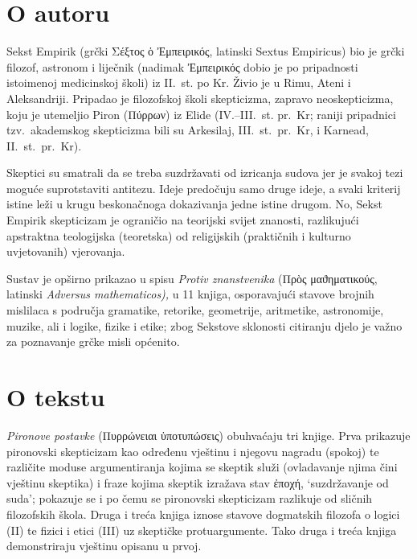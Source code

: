 
\section*{O autoru}

Sekst Empirik (grčki Σέξτος ὁ Ἐμπειρικός, latinski Sextus Empiricus) bio je grčki filozof, astronom i liječnik (nadimak Ἐμπειρικός dobio je po pripadnosti istoimenoj medicinskoj školi) iz II.~st. po Kr. Živio je u Rimu, Ateni i Aleksandriji. Pripadao je filozofskoj školi skepticizma, zapravo neoskepticizma, koju je utemeljio Piron \textgreek[variant=ancient]{(Πύρρων)} iz Elide (IV.–III.~st. pr.~Kr; raniji pripadnici tzv.\ akademskog skepticizma bili su Arkesilaj, III.~st.\ pr.~Kr, i Karnead, II.~st.\ pr.~Kr). 

Skeptici su smatrali da se treba suzdržavati od izricanja sudova jer je svakoj tezi moguće suprotstaviti antitezu. Ideje predočuju samo druge ideje, a svaki kriterij istine leži u krugu beskonačnoga dokazivanja jedne istine drugom. No, Sekst Empirik skepticizam je ograničio na teorijski svijet znanosti, razlikujući apstraktna teologijska (teoretska) od religijskih (praktičnih i kulturno uvjetovanih) vjerovanja. 

Sustav je opširno prikazao u spisu \textit{Protiv znanstvenika} \textgreek[variant=ancient]{(Πρὸς μαϑηματικούς,} latinski \textit{Adversus mathematicos),} u 11 knjiga, osporavajući stavove brojnih mislilaca s područja gramatike, retorike, geometrije, aritmetike, astronomije, muzike, ali i logike, fizike i etike; zbog Sekstove sklonosti citiranju djelo je važno za poznavanje grčke misli općenito.

\section*{O tekstu}

\textit{Pironove postavke} \textgreek[variant=ancient]{(Πυρρώνειαι ὑποτυπώσεις)} obuhvaćaju tri knjige. Prva prikazuje pironovski skepticizam kao određenu vještinu i njegovu nagradu (spokoj) te različite moduse argumentiranja kojima se skeptik služi (ovladavanje njima čini vještinu skeptika) i fraze kojima skeptik izražava stav ἐποχή, `suzdržavanje od suda'; pokazuje se i po čemu se pironovski skepticizam razlikuje od sličnih filozofskih škola. Druga i treća knjiga iznose stavove dogmatskih filozofa o logici (II) te fizici i etici (III) uz skeptičke protuargumente. Tako druga i treća knjiga demonstriraju vještinu opisanu u prvoj.

